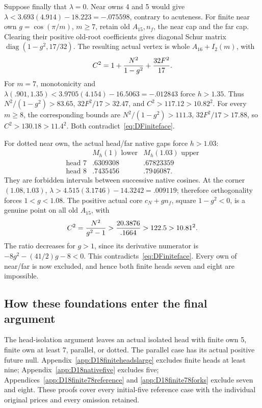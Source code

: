 Suppose finally that \(\lambda=0\).
Near owns 4 and 5 would give
\(\lambda<3.693(4.914)-18.223=-.075598\),
contrary to acuteness.
For finite near own \(g=\cos(\pi/m)\), \(m\ge7\),
retain old \(A_{15},n_f\), the near cap and the far cap.
Clearing their positive old-root coefficients gives diagonal
Schur matrix \(\operatorname{diag}(1-g^2,17/32)\).
The resulting actual vertex is whole \(A_{16}+I_2(m)\), with
\[
                C^2=1+{N^2\over1-g^2}+{32F^2\over17}.
\]
For \(m=7\), monotonicity and
\(\lambda(.901,1.35)<3.9705(4.154)-16.5063=-.012843\)
force \(h>1.35\).  Thus \(N^2/(1-g^2)>83.65\),
\(32F^2/17>32.47\), and \(C^2>117.12>10.82^2\).
For every \(m\ge8\), the corresponding bounds are
\(N^2/(1-g^2)>111.3\), \(32F^2/17>17.88\),
so \(C^2>130.18>11.4^2\).
Both contradict~\eqref{eq:DFiniteface}.

For dotted near own, the actual head/far native gaps force
\(h>1.03\):
\[
 \begin{array}{c|cc}
 &M_h(1)\text{ lower}&M_h(1.03)\text{ upper}\\ \hline
 \text{head }7&.6309308&.67823359\\
 \text{head }8&.7435456&.7946087 .
 \end{array}
\]
They are forbidden intervals between successive native cosines.
At the corner \((1.08,1.03)\),
\(\lambda>4.515(3.1746)-14.3242=.009119\);
therefore orthogonality forces \(1<g<1.08\).
The positive actual core \(c_N+gn_f\), square \(1-g^2<0\),
is a genuine point on all old \(A_{15}\), with
\[
 C^2={N^2\over g^2-1}>
 {20.3876\over.1664}>122.5>10.81^2 .
\]
The ratio decreases for \(g>1\), since its derivative numerator
is \(-8g^2-(41/2)g-8<0\).
This contradicts~\eqref{eq:DFiniteface}.
Every own of near/far is now excluded, and hence both finite
heads seven and eight are impossible.

\subsection{How these foundations enter the final argument}
\label{app:D18foundationcomposition}

The head-isolation argument leaves an actual isolated head with
finite own 5, finite own at least 7, parallel, or dotted.
The parallel case has its actual positive future null.
Appendix~\ref{app:D18finiteheadslarge} excludes finite heads
at least nine; Appendix~\ref{app:D18nativefive} excludes five;
Appendices~\ref{app:D18finite78reference} and
\ref{app:D18finite78forks} exclude seven and eight.
These proofs cover every initial-five reference case with the
individual original prices and every omission retained.

